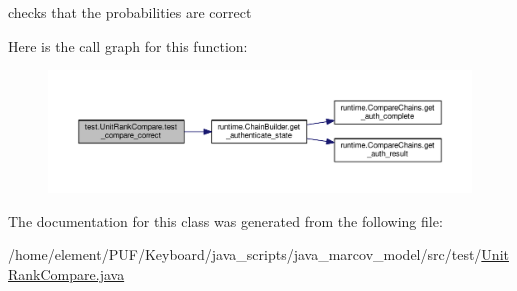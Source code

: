 checks that the probabilities are correct 



Here is the call graph for this function\+:\nopagebreak
\begin{figure}[H]
\begin{center}
\leavevmode
\includegraphics[width=350pt]{classtest_1_1_unit_rank_compare_ac8fdeb295d6451a69577d1ebe8ce458c_cgraph}
\end{center}
\end{figure}




The documentation for this class was generated from the following file\+:\begin{DoxyCompactItemize}
\item 
/home/element/\+P\+U\+F/\+Keyboard/java\+\_\+scripts/java\+\_\+marcov\+\_\+model/src/test/\hyperlink{_unit_rank_compare_8java}{Unit\+Rank\+Compare.\+java}\end{DoxyCompactItemize}
